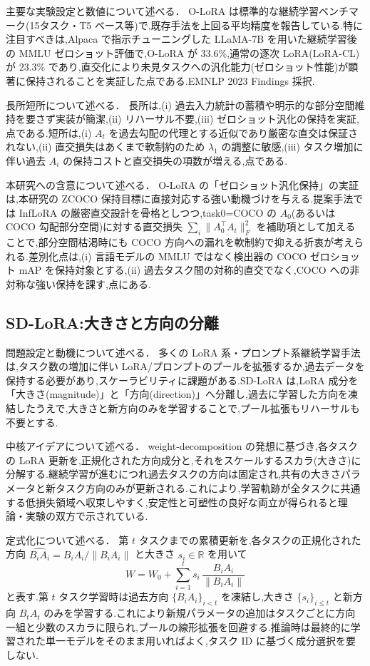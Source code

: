 主要な実験設定と数値について述べる．
O-LoRA \cite{olora} は標準的な継続学習ベンチマーク(15タスク・T5 ベース等)で,既存手法を上回る平均精度を報告している.特に注目すべきは,Alpaca で指示チューニングした LLaMA-7B を用いた継続学習後の MMLU ゼロショット評価で,O-LoRA が $33.6\%$,通常の逐次 LoRA(LoRA-CL)が $23.3\%$ であり,直交化により未見タスクへの汎化能力(ゼロショット性能)が顕著に保持されることを実証した点である.EMNLP 2023 Findings 採択.

長所短所について述べる．
長所は,(i) 過去入力統計の蓄積や明示的な部分空間維持を要さず実装が簡潔,(ii) リハーサル不要,(iii) ゼロショット汎化の保持を実証,点である.短所は,(i) $A_t$ を過去勾配の代理とする近似であり厳密な直交は保証されない,(ii) 直交損失はあくまで軟制約のため $\lambda_1$ の調整に敏感,(iii) タスク増加に伴い過去 $A_i$ の保持コストと直交損失の項数が増える,点である.

本研究への含意について述べる．
O-LoRA の「ゼロショット汎化保持」の実証は,本研究の ZCOCO 保持目標に直接対応する強い動機づけを与える.提案手法では InfLoRA の厳密直交設計を骨格としつつ,task0=COCO の $A_0$(あるいは COCO 勾配部分空間)に対する直交損失 $\sum_i \|A_0^\top A_t\|_F^2$ を補助項として加えることで,部分空間枯渇時にも COCO 方向への漏れを軟制約で抑える折衷が考えられる.差別化点は,(i) 言語モデルの MMLU ではなく検出器の COCO ゼロショット mAP を保持対象とする,(ii) 過去タスク間の対称的直交でなく,COCO への非対称な強い保持を課す,点にある.

\subsection{SD-LoRA:大きさと方向の分離}

問題設定と動機について述べる．
多くの LoRA 系・プロンプト系継続学習手法は,タスク数の増加に伴い LoRA/プロンプトのプールを拡張するか,過去データを保持する必要があり,スケーラビリティに課題がある.SD-LoRA \cite{sdlora} は,LoRA 成分を「大きさ(magnitude)」と「方向(direction)」へ分離し,過去に学習した方向を凍結したうえで,大きさと新方向のみを学習することで,プール拡張もリハーサルも不要とする.

中核アイデアについて述べる．
weight-decomposition の発想に基づき,各タスクの LoRA 更新を,正規化された方向成分と,それをスケールするスカラ(大きさ)に分解する.継続学習が進むにつれ過去タスクの方向は固定され,共有の大きさパラメータと新タスク方向のみが更新される.これにより,学習軌跡が全タスクに共通する低損失領域へ収束しやすく,安定性と可塑性の良好な両立が得られると理論・実験の双方で示されている.

定式化について述べる．
第 $t$ タスクまでの累積更新を,各タスクの正規化された方向 $\widehat{B_i A_i} = B_i A_i / \| B_i A_i \|$ と大きさ $s_i \in \mathbb{R}$ を用いて
\begin{equation}
W = W_0 + \sum_{i=1}^{t} s_i \, \frac{B_i A_i}{\| B_i A_i \|}
\end{equation}
と表す.第 $t$ タスク学習時は過去方向 $\{B_i A_i\}_{i<t}$ を凍結し,大きさ $\{s_i\}_{i \leq t}$ と新方向 $B_t A_t$ のみを学習する.これにより新規パラメータの追加はタスクごとに方向一組と少数のスカラに限られ,プールの線形拡張を回避する.推論時は最終的に学習された単一モデルをそのまま用いればよく,タスク ID に基づく成分選択を要しない.

